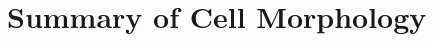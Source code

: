 \documentclass[10pt,a4paper,twoside,openright]{book}
\begin{document}









\section{Summary of Cell Morphology}


\begin{landscape}
{\small{}}
\end{landscape}





\newpage
\listoftodos
\end{document}
